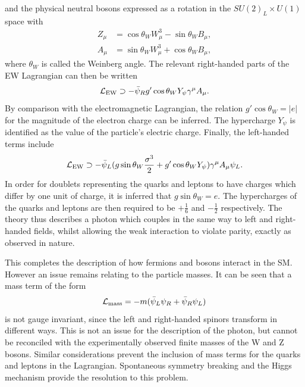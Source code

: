 and the physical neutral bosons expressed as a rotation in the $SU(2)_L \times U(1)$ space with
\begin{equation}
\label{eq:theory_rotation}
\begin{split}
Z_\mu &= \cos{\theta_W} W_\mu^3 - \sin{\theta_W} B_\mu , \\
A_\mu &= \sin{\theta_W} W_\mu^3 + \cos{\theta_W} B_\mu ,
\end{split}
\end{equation}
where $\theta_W$ is called the Weinberg angle.
The relevant right-handed parts of the EW Lagrangian can then be written
\begin{equation}
\mathcal{L}_{\textrm{EW}} \supset -\bar{\psi}_R g' \cos{\theta_W} Y_\psi \gamma^\mu A_\mu .
\end{equation}
By comparison with the electromagnetic Lagrangian, 
the relation $g' \cos{\theta_W} = |e|$ for the magnitude of the electron charge can be inferred.
The hypercharge $Y_\psi$ is identified as the value of the particle's electric charge.
Finally, the left-handed terms include
\begin{equation}
\mathcal{L}_{\textrm{EW}} \supset - \bar{\psi}_L(g\sin{\theta_W} \frac{\sigma^3}{2} 
                            + g' \cos{\theta_W} Y_\psi) \gamma^\mu A_\mu \psi_L .
\end{equation}
In order for doublets representing the quarks and leptons to have charges 
which differ by one unit of charge, it is inferred that $g\sin{\theta_W} = e$. 
The hypercharges of the quarks and leptons are then required to be 
$+\frac{1}{6}$ and $-\frac{1}{2}$ respectively.
The theory thus describes a photon which couples in the same way to left and right-handed fields, 
whilst allowing the weak interaction to violate parity, exactly as observed in nature.

This completes the description of how fermions and bosons interact in the SM.
However an issue remains relating to the particle masses.
It can be seen that a mass term of the form
\begin{equation}
\label{eq:theory_badmass}
\mathcal{L}_{\textrm{mass}} = -m(\bar{\psi}_L \psi_R + \bar{\psi}_R \psi_L)
\end{equation}
is not gauge invariant, since the left and right-handed spinors transform in different ways.
This is not an issue for the description of the photon, 
but cannot be reconciled with the experimentally observed finite masses of the W and Z bosons.
Similar considerations prevent the inclusion of mass terms 
for the quarks and leptons in the Lagrangian.
Spontaneous symmetry breaking and the Higgs mechanism provide the resolution to this problem.

